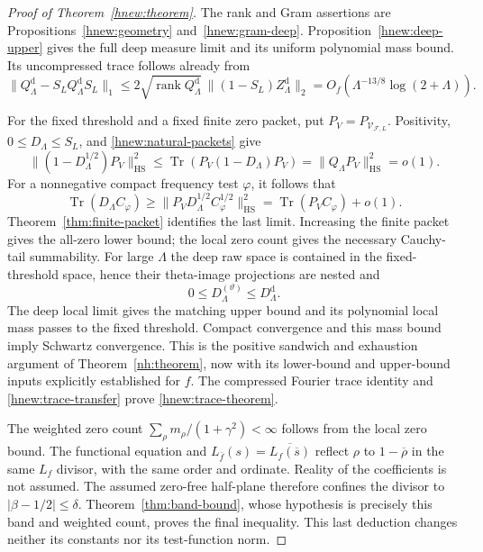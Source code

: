 \begin{proof}[Proof of Theorem~\ref{hnew:theorem}]
The rank and Gram assertions are
Propositions~\ref{hnew:geometry} and~\ref{hnew:gram-deep}.
Proposition~\ref{hnew:deep-upper} gives the full deep measure limit
and its uniform polynomial mass bound.  Its uncompressed trace
follows already from
\[
 \|Q_\Lambda^{\mathrm d}-S_LQ_\Lambda^{\mathrm d}S_L\|_1
 \le2\sqrt{\operatorname{rank}Q_\Lambda^{\mathrm d}}\,
       \|(1-S_L)Z_\Lambda^{\mathrm d}\|_2
       =O_f(\Lambda^{-13/8}\log(2+\Lambda)).
\]

For the fixed threshold and a fixed finite zero packet, put
$P_V=P_{\mathcal V_{\mathcal F,L}}$.
Positivity, $0\le D_\Lambda\le S_L$, and
\eqref{hnew:natural-packets} give
\[
 \|(1-D_\Lambda^{1/2})P_V\|_{\mathrm{HS}}^2
       \le\operatorname{Tr}(P_V(1-D_\Lambda)P_V)
       =\|Q_\Lambda P_V\|_{\mathrm{HS}}^2=o(1).
\]
For a nonnegative compact frequency test $\varphi$, it follows that
\[
 \operatorname{Tr}(D_\Lambda C_\varphi)
 \ge\|P_VD_\Lambda^{1/2}C_\varphi^{1/2}\|_{\mathrm{HS}}^2
 =\operatorname{Tr}(P_VC_\varphi)+o(1).
\]
Theorem~\ref{thm:finite-packet} identifies the last limit.
Increasing the finite packet gives the all-zero lower bound;
the local zero count gives the necessary Cauchy-tail summability.
For large $\Lambda$ the deep raw space is contained in the
fixed-threshold space, hence their theta-image projections are
nested and
\[
 0\le D_\Lambda^{(\vartheta)}\le D_\Lambda^{\mathrm d}.
\]
The deep local limit gives the matching upper bound and its
polynomial local mass passes to the fixed threshold.
Compact convergence and this mass bound imply Schwartz convergence.
This is the positive sandwich and exhaustion argument of
Theorem~\ref{nh:theorem}, now with its lower-bound and upper-bound
inputs explicitly established for $f$.
The compressed Fourier trace identity and
\eqref{hnew:trace-transfer} prove \eqref{hnew:trace-theorem}.

The weighted zero count
$\sum_\rho m_\rho/(1+\gamma^2)<\infty$ follows from the local
zero bound.  The functional equation and
$L_{\bar f}(s)=\overline{L_f(\overline s)}$
reflect $\rho$ to $1-\overline\rho$ in the same $L_f$ divisor,
with the same order and ordinate.  Reality of the coefficients
is not assumed.
The assumed zero-free half-plane therefore confines the divisor
to $|\beta-1/2|\le\delta$.
Theorem~\ref{thm:band-bound}, whose hypothesis is precisely this
band and weighted count, proves the final inequality.
This last deduction changes neither its constants nor its
test-function norm.
\end{proof}

